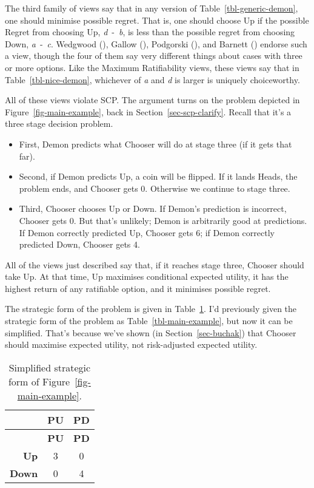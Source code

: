 \documentclass[
  10pt,
  letterpaper,
  DIV=11,
  numbers=noendperiod,
  twoside]{scrartcl}
\providecommand{\tightlist}{%
  \setlength{\itemsep}{0pt}\setlength{\parskip}{0pt}}\usepackage{longtable,booktabs,array}
\begin{document}
The third family of views say that in any version of
Table~\ref{tbl-generic-demon}, one should minimise possible regret. That
is, one should choose Up if the possible Regret from choosing Up,
\emph{d}~-~\emph{b}, is less than the possible regret from choosing
Down, \emph{a}~-~\emph{c}. Wedgwood
(), Gallow
(), Podgorski
(), and Barnett
() endorse such a view, though the four
of them say very different things about cases with three or more
options. Like the Maximum Ratifiability views, these views say that in
Table~\ref{tbl-nice-demon}, whichever of \emph{a} and \emph{d} is larger
is uniquely choiceworthy.

All of these views violate SCP. The argument turns on the problem
depicted in Figure~\ref{fig-main-example}, back in
Section~\ref{sec-scp-clarify}. Recall that it's a three stage decision
problem.

\begin{itemize}
\tightlist
\item
  First, Demon predicts what Chooser will do at stage three (if it gets
  that far).
\item
  Second, if Demon predicts Up, a coin will be flipped. If it lands
  Heads, the problem ends, and Chooser gets 0. Otherwise we continue to
  stage three.
\item
  Third, Chooser chooses Up or Down. If Demon's prediction is incorrect,
  Chooser gets 0. But that's unlikely; Demon is arbitrarily good at
  predictions. If Demon correctly predicted Up, Chooser gets 6; if Demon
  correctly predicted Down, Chooser gets 4.
\end{itemize}

All of the views just described say that, if it reaches stage three,
Chooser should take Up. At that time, Up maximises conditional expected
utility, it has the highest return of any ratifiable option, and it
minimises possible regret.

The strategic form of the problem is given in
Table~\ref{tbl-main-example-simple}. I'd previously given the strategic
form of the problem as Table~\ref{tbl-main-example}, but now it can be
simplified. That's because we've shown (in Section~\ref{sec-buchak})
that Chooser should maximise expected utility, not risk-adjusted
expected utility.

\begin{longtable}[]{@{}rcc@{}}
\caption{Simplified strategic form of
Figure~\ref{fig-main-example}.}\label{tbl-main-example-simple}\tabularnewline
\toprule\noalign{}
& \textbf{PU} & \textbf{PD} \\
\midrule\noalign{}
\endfirsthead
\toprule\noalign{}
& \textbf{PU} & \textbf{PD} \\
\midrule\noalign{}
\endhead
\bottomrule\noalign{}
\endlastfoot
\textbf{Up} & 3 & 0 \\
\textbf{Down} & 0 & 4 \\
\end{longtable}
\end{document}
